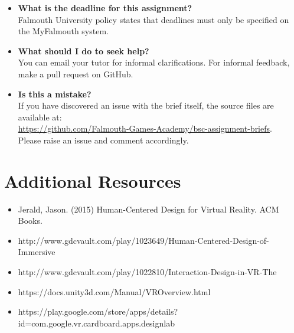 \documentclass{../../fal_assignment}
\begin{document}
\begin{itemize}
	\item 	\textbf{What is the deadline for this assignment?} \\ 
    		Falmouth University policy states that deadlines must only be specified on the MyFalmouth system.
    		
	\item 	\textbf{What should I do to seek help?} \\ 
    		You can email your tutor for informal clarifications. For informal feedback, make a pull request on GitHub. 
    		
    	\item 	\textbf{Is this a mistake?} \\ 	
    		If you have discovered an issue with the brief itself, the source files are available at: \\
    		\url{https://github.com/Falmouth-Games-Academy/bsc-assignment-briefs}.\\
    		 Please raise an issue and comment accordingly.
\end{itemize}

\section*{Additional Resources}

\begin{itemize}
    \item Jerald, Jason. (2015) Human-Centered Design for Virtual Reality. ACM Books.
    \item http://www.gdcvault.com/play/1023649/Human-Centered-Design-of-Immersive 
    \item http://www.gdcvault.com/play/1022810/Interaction-Design-in-VR-The
    \item https://docs.unity3d.com/Manual/VROverview.html
    \item https://play.google.com/store/apps/details?id=com.google.vr.cardboard.apps.designlab
    
\end{itemize}

\rubricyeartwo
\end{document}
